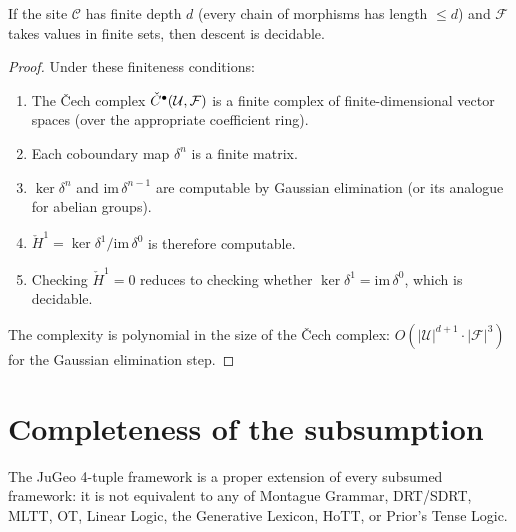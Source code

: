 \begin{theorem}
\label{thm:dec-bounded}
If the site $\mathcal{C}$ has finite depth $d$ (every chain of
morphisms has length $\leq d$) and $\mathcal{F}$ takes values in
finite sets, then descent is decidable.
\end{theorem}

\begin{proof}
Under these finiteness conditions:
\begin{enumerate}[label=(\arabic*),nosep]
\item The \v{C}ech complex $\check{C}^\bullet(\mathcal{U}, \mathcal{F})$
  is a finite complex of finite-dimensional vector spaces (over the
  appropriate coefficient ring).
\item Each coboundary map $\delta^n$ is a finite matrix.
\item $\ker \delta^n$ and $\mathrm{im}\, \delta^{n-1}$ are computable
  by Gaussian elimination (or its analogue for abelian groups).
\item $\check{H}^1 = \ker \delta^1 / \mathrm{im}\, \delta^0$ is
  therefore computable.
\item Checking $\check{H}^1 = 0$ reduces to checking whether
  $\ker \delta^1 = \mathrm{im}\, \delta^0$, which is decidable.
\end{enumerate}
The complexity is polynomial in the size of the \v{C}ech complex:
$O(|\mathcal{U}|^{d+1} \cdot |\mathcal{F}|^3)$ for the Gaussian
elimination step.
\end{proof}

\section{Completeness of the subsumption}
\label{sec:completeness}

\begin{theorem}
\label{thm:proper-detail}
The JuGeo 4-tuple framework is a proper extension of every subsumed
framework: it is not equivalent to any of Montague Grammar, DRT/SDRT,
MLTT, OT, Linear Logic, the Generative Lexicon, HoTT, or Prior's
Tense Logic.
\end{theorem}

